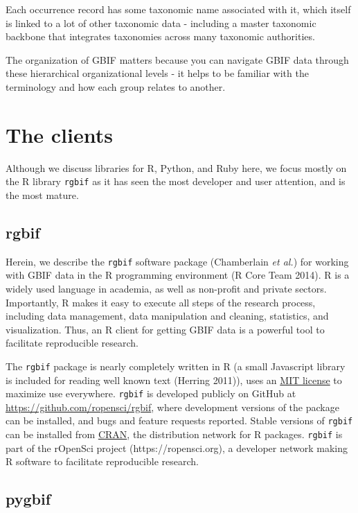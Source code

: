 \documentclass[3p]{elsarticle} %
\begin{document}
Each occurrence record has some taxonomic name associated with it, which
itself is linked to a lot of other taxonomic data - including a master
taxonomic backbone that integrates taxonomies across many taxonomic
authorities.

The organization of GBIF matters because you can navigate GBIF data
through these hierarchical organizational levels - it helps to be
familiar with the terminology and how each group relates to another.

\hypertarget{the-clients}{%
\section{The clients}\label{the-clients}}

Although we discuss libraries for R, Python, and Ruby here, we focus
mostly on the R library \texttt{rgbif} as it has seen the most developer
and user attention, and is the most mature.

\hypertarget{rgbif}{%
\subsection{rgbif}\label{rgbif}}

Herein, we describe the \texttt{rgbif} software package (Chamberlain
\emph{et al.}) for working with GBIF data in the R programming
environment (R Core Team 2014). R is a widely used language in academia,
as well as non-profit and private sectors. Importantly, R makes it easy
to execute all steps of the research process, including data management,
data manipulation and cleaning, statistics, and visualization. Thus, an
R client for getting GBIF data is a powerful tool to facilitate
reproducible research.

The \texttt{rgbif} package is nearly completely written in R (a small
Javascript library is included for reading well known text (Herring
2011)), uses an \href{https://choosealicense.com/licenses/mit/}{MIT
license} to maximize use everywhere. \texttt{rgbif} is developed
publicly on GitHub at \url{https://github.com/ropensci/rgbif}, where
development versions of the package can be installed, and bugs and
feature requests reported. Stable versions of \texttt{rgbif} can be
installed from
\href{https://cran.rstudio.com/web/packages/rgbif/}{CRAN}, the
distribution network for R packages. \texttt{rgbif} is part of the
rOpenSci project (https://ropensci.org), a developer network making R
software to facilitate reproducible research.

\hypertarget{pygbif}{%
\subsection{pygbif}\label{pygbif}}
\end{document}
